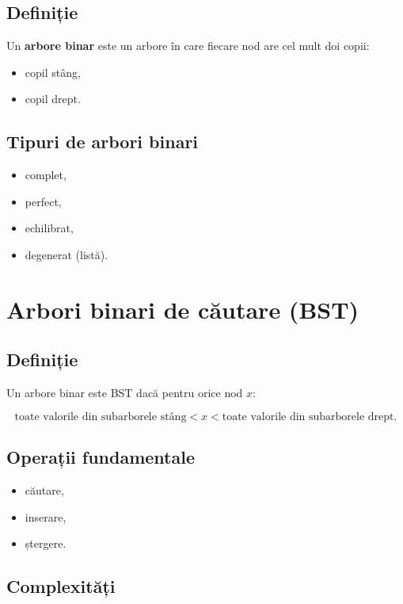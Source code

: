 \documentclass[12pt]{article}
\begin{document}
\subsection{Definiție}

Un \textbf{arbore binar} este un arbore în care fiecare nod are cel mult doi copii:
\begin{itemize}
    \item copil stâng,
    \item copil drept.
\end{itemize}

\subsection{Tipuri de arbori binari}

\begin{itemize}
    \item complet,
    \item perfect,
    \item echilibrat,
    \item degenerat (listă).
\end{itemize}

\section{Arbori binari de căutare (BST)}

\subsection{Definiție}

Un arbore binar este BST dacă pentru orice nod $x$:


\[
\text{toate valorile din subarborele stâng} < x < \text{toate valorile din subarborele drept}.
\]



\subsection{Operații fundamentale}

\begin{itemize}
    \item căutare,
    \item inserare,
    \item ștergere.
\end{itemize}

\subsection{Complexități}
\end{document}
